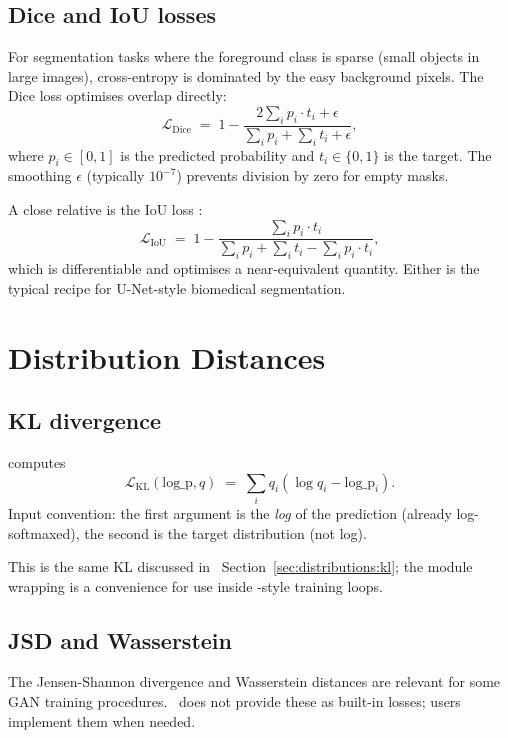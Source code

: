 \subsection{Dice and IoU losses}
\label{ssec:losses:dice_iou}

For segmentation tasks where the foreground class is sparse
(small objects in large images), cross-entropy is dominated by
the easy background pixels. The Dice loss \cite{ronneberger_unet_2015}
optimises overlap directly:
\[
  \mathcal{L}_{\text{Dice}} \;=\; 1 - \frac{2 \sum_i p_i \cdot t_i + \epsilon}{\sum_i p_i + \sum_i t_i + \epsilon},
\]
where $p_i \in [0, 1]$ is the predicted probability and
$t_i \in \{0, 1\}$ is the target. The smoothing $\epsilon$
(typically $10^{-7}$) prevents division by zero for
empty masks.

A close relative is the IoU loss
\cite{lin_focal_2017}:
\[
  \mathcal{L}_{\text{IoU}} \;=\; 1 - \frac{\sum_i p_i \cdot t_i}{\sum_i p_i + \sum_i t_i - \sum_i p_i \cdot t_i},
\]
which is differentiable and optimises a near-equivalent quantity.
Either is the typical recipe for U-Net-style biomedical
segmentation.

\section{Distribution Distances}
\label{sec:losses:distribution}

\subsection{KL divergence}
\label{ssec:losses:kl}

computes
\[
\mathcal{L}_{\text{KL}}(\mathrm{log\_p}, q) \;=\; \sum_i q_i (\log q_i - \mathrm{log\_p}_i).
\]
Input convention: the first argument is the \emph{log} of the
prediction (already log-softmaxed), the second is the target
distribution (not log).

This is the same KL discussed in
~Section~\ref{sec:distributions:kl}; the
 module wrapping is a convenience for use inside
-style training loops.

\subsection{JSD and Wasserstein}
\label{ssec:losses:jsd_wasserstein}

The Jensen-Shannon divergence and Wasserstein distances are
relevant for some GAN training procedures. \Lucid\ does not
provide these as built-in losses; users implement them when
needed.


